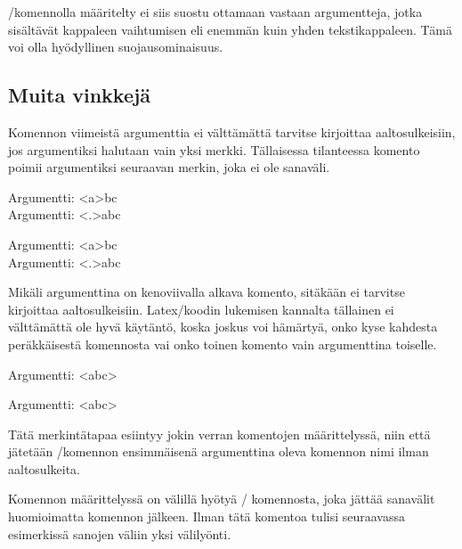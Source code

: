 \-/komennolla määritelty  ei siis
suostu ottamaan vastaan argumentteja, jotka sisältävät kappaleen
vaihtumisen eli enemmän kuin yhden tekstikappaleen. Tämä voi olla
hyödyllinen suojausominaisuus.

\subsection{Muita vinkkejä}

Komennon viimeistä argumenttia ei välttämättä tarvitse kirjoittaa
aaltosulkeisiin, jos argumentiksi halutaan vain yksi merkki. Tällaisessa
tilanteessa komento poimii argumentiksi seuraavan merkin, joka ei ole
sanaväli.

\begin{koodilohkosis}
\newcommand{\x}[1]{Argumentti: <#1>}
\x abc \\
\x.abc
\end{koodilohkosis}

\begin{tulossis}
  Argumentti: <a>bc \\
  Argumentti: <.>abc
\end{tulossis}

\noindent
Mikäli argumenttina on kenoviivalla alkava komento, sitäkään ei tarvitse
kirjoittaa aaltosulkeisiin. Latex\-/koodin lukemisen kannalta tällainen
ei välttämättä ole hyvä käytäntö, koska joskus voi hämärtyä, onko kyse
kahdesta peräkkäisestä komennosta vai onko toinen komento vain
argumenttina toiselle.

\begin{koodilohkosis}
\newcommand{\x}[1]{Argumentti: <#1>}
\newcommand{\yyy}{abc}
\x\yyy
\end{koodilohkosis}

\begin{tulossis}
  Argumentti: <abc>
\end{tulossis}

\noindent
Tätä merkintätapaa esiintyy jokin verran komentojen määrittelyssä, niin
että jätetään \-/komennon ensimmäisenä argumenttina
oleva komennon nimi ilman aaltosulkeita.

\begin{koodilohkosis}
\newcommand\yyy{abc}
\end{koodilohkosis}

\noindent
Komennon määrittelyssä on välillä hyötyä \-/
komennosta, joka jättää sanavälit huomioimatta komennon jälkeen. Ilman
tätä komentoa tulisi seuraavassa esimerkissä sanojen väliin yksi
välilyönti.

